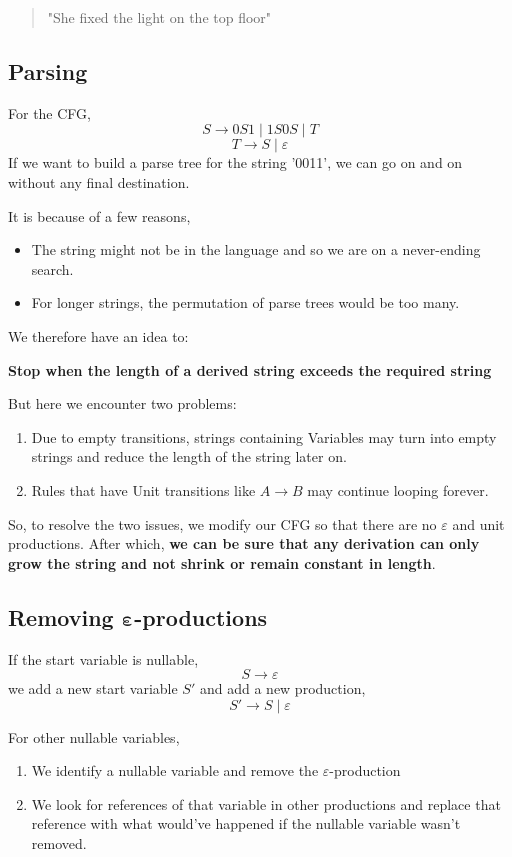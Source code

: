 \documentclass{article}
\begin{document}
    \begin{quote}
        "She fixed the light on the top floor"
    \end{quote}
    
    \subsection*{Parsing}
    For the CFG,
    $$S\to 0S1\;|\;1S0S\;|\;T$$
    $$T\to S\;|\;\varepsilon$$
    If we want to build a parse tree for the string '0011', we can go on and on without any final destination.\par
    It is because of a few reasons,
    \begin{itemize}{}{}
        \item The string might not be in the language and so we are on a never-ending search.
        \item For longer strings, the permutation of parse trees would be too many.
    \end{itemize}
    We therefore have an idea to:\par
    \textbf{Stop when the length of a derived string exceeds the required string}\par
    But here we encounter two problems:
    \begin{enumerate}
        \item Due to empty transitions, strings containing Variables may turn into empty strings and reduce the length of the string later on.
        \item Rules that have Unit transitions like $A\to B$ may continue looping forever.
    \end{enumerate}
    So, to resolve the two issues, we modify our CFG so that there are no $\varepsilon$ and unit productions. After which, \textbf{we can be sure that any derivation can only grow the string and not shrink or remain constant in length}.
    
    \subsection*{Removing $\bm{\varepsilon}$-productions}
    If the start variable is nullable,
    $$S\to \varepsilon$$
    we add a new start variable $S'$ and add a new production,
    $$S'\to S\;|\;\varepsilon$$\par 
    For other nullable variables,
    \begin{enumerate}
        \item We identify a nullable variable and remove the $\varepsilon$-production
        \item We look for references of that variable in other productions and replace that reference with what would've happened if the nullable variable wasn't removed.
    \end{enumerate}
    
\end{document}
